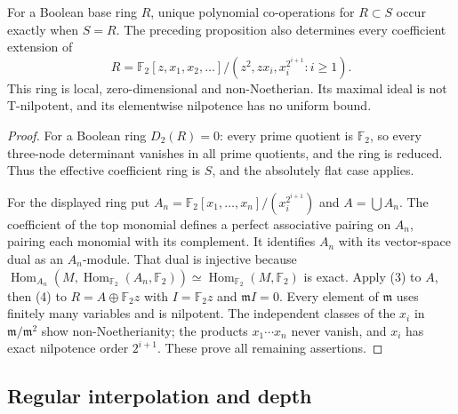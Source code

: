\begin{corollary}\label{cor:boolean-and-unbounded-nilpotent-bases}
For a Boolean base ring $R$, unique polynomial co-operations for
$R\subset S$ occur exactly when $S=R$. The preceding proposition
also determines every coefficient extension of
\[
 R=\mathbb F_2[z,x_1,x_2,\ldots]/
       (z^2,zx_i,x_i^{2^{i+1}}:i\ge1).
\]
This ring is local, zero-dimensional and non-Noetherian. Its maximal
ideal is not T-nilpotent, and its elementwise nilpotence has no
uniform bound.
\end{corollary}
\begin{proof}
For a Boolean ring $D_2(R)=0$: every prime quotient is $\mathbb F_2$,
so every three-node determinant vanishes in all prime quotients,
and the ring is reduced. Thus the effective coefficient ring is
$S$, and the absolutely flat case applies.

For the displayed ring put
$A_n=\mathbb F_2[x_1,\ldots,x_n]/(x_i^{2^{i+1}})$ and $A=\bigcup A_n$.
The coefficient of the top monomial defines a perfect associative
pairing on $A_n$, pairing each monomial with its complement. It
identifies $A_n$ with its vector-space dual as an $A_n$-module.
That dual is injective because
$\operatorname{Hom}_{A_n}(M,\operatorname{Hom}_{\mathbb F_2}(A_n,\mathbb F_2))
\simeq\operatorname{Hom}_{\mathbb F_2}(M,\mathbb F_2)$ is exact.
Apply (3) to $A$, then (4) to $R=A\oplus\mathbb F_2z$ with
$I=\mathbb F_2z$ and $\mathfrak mI=0$.
Every element of $\mathfrak m$ uses finitely many variables and is
nilpotent. The independent classes of the $x_i$ in
$\mathfrak m/\mathfrak m^2$ show non-Noetherianity; the products
$x_1\cdots x_n$ never vanish, and $x_i$ has exact nilpotence order
$2^{i+1}$. These prove all remaining assertions.
\end{proof}

\subsection{Regular interpolation and depth}

